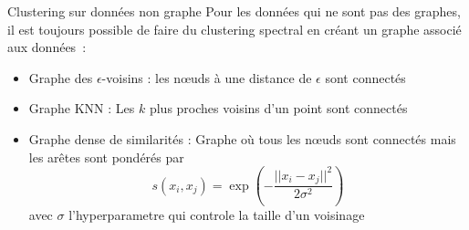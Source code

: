 \begin{frame}{Clustering sur données non graphe}
    Pour les données qui ne sont pas des graphes, il est toujours possible de faire du clustering spectral en créant un graphe associé aux données~:
    \begin{itemize}
        \item Graphe des $\epsilon$-voisins : les nœuds à une distance de $\epsilon$ sont connectés
        \item Graphe KNN : Les $k$ plus proches voisins d'un point sont connectés
        \item Graphe dense de similarités : Graphe où tous les nœuds sont connectés mais les arêtes sont pondérés par 
        $$
            s(x_i,x_j) = \exp \left( -\frac{||x_i-x_j||^2}{2\sigma^2} \right)
        $$
        avec $\sigma$ l'hyperparametre qui controle la taille d'un \og voisinage \fg{}
    \end{itemize}
\end{frame}